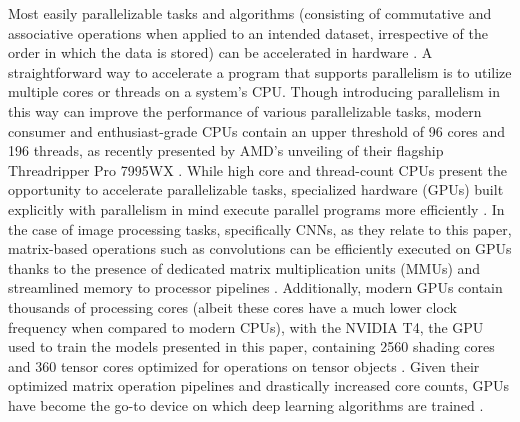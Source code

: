 Most easily parallelizable tasks and algorithms (consisting of commutative and associative operations when applied to an intended dataset, irrespective of the order in which the data is stored) can be accelerated in hardware \cite{pottenger_role_1998}. A straightforward way to accelerate a program that supports parallelism is to utilize multiple cores or threads on a system's CPU. Though introducing parallelism in this way can improve the performance of various parallelizable tasks, modern consumer and enthusiast-grade CPUs contain an upper threshold of 96 cores and 196 threads, as recently presented by AMD's unveiling of their flagship Threadripper Pro 7995WX \cite{noauthor_amd_nodate}. While high core and thread-count CPUs present the opportunity to accelerate parallelizable tasks, specialized hardware (GPUs) built explicitly with parallelism in mind execute parallel programs more efficiently \cite{pottenger_role_1998}. In the case of image processing tasks, specifically CNNs, as they relate to this paper, matrix-based operations such as convolutions can be efficiently executed on GPUs thanks to the presence of dedicated matrix multiplication units (MMUs) and streamlined memory to processor pipelines \cite{fatahalian_understanding_2004}. Additionally, modern GPUs contain thousands of processing cores (albeit these cores have a much lower clock frequency when compared to modern CPUs), with the NVIDIA T4, the GPU used to train the models presented in this paper, containing 2560 shading cores and 360 tensor cores optimized for operations on tensor objects \cite{emily_apsey_tesla_2019}. Given their optimized matrix operation pipelines and drastically increased core counts, GPUs have become the go-to device on which deep learning algorithms are trained \cite{steinkraus_using_2005}.
